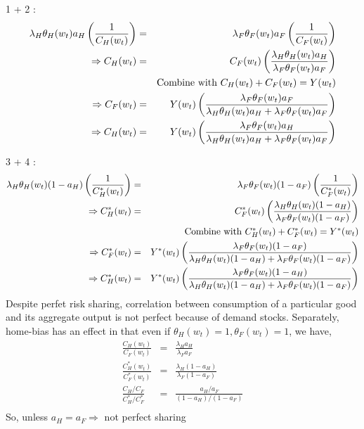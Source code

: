 \documentclass[]{article}
\begin{document}
1 + 2 :
\begin{eqnarray}
\lambda_H \theta_H(w_t) a_H \left(\frac{1}{C_H(w_t)}\right) &=& \lambda_F \theta_F(w_t) a_F \left(\frac{1}{C_F(w_t)}\right)\notag\\
\Rightarrow C_H(w_t) &=& C_F(w_t) \left(\frac{\lambda_H \theta_H(w_t)a_H}{\lambda_F \theta_F(w_t)a_F}\right)\notag\\
&& \mbox{Combine with $C_H(w_t) + C_F(w_t) = Y(w_t)$}\notag\\
\Rightarrow C_F(w_t) &=& Y(w_t) \left(\frac{\lambda_F \theta_F (w_t) a_F}{\lambda_H \theta_H (w_t) a_H + \lambda_F \theta_F (w_t) a_F}\right)\\
\Rightarrow C_H(w_t) &=& Y(w_t) \left(\frac{\lambda_F \theta_F (w_t) a_H}{\lambda_H \theta_H (w_t) a_H + \lambda_F \theta_F (w_t) a_F}\right)
\end{eqnarray}

3 + 4 :
\begin{eqnarray}
\lambda_H \theta_H(w_t) (1-a_H) \left(\frac{1}{C_H^*(w_t)}\right) &=& \lambda_F \theta_F(w_t) (1-a_F) \left(\frac{1}{C_F^*(w_t)}\right)\notag\\
\Rightarrow C_H^*(w_t) &=& C_F^*(w_t) \left(\frac{\lambda_H \theta_H(w_t)(1-a_H)}{\lambda_F \theta_F(w_t)(1-a_F)}\right)\notag\\
&& \mbox{Combine with $C_H^*(w_t) + C_F^*(w_t) = Y^*(w_t)$}\notag\\
\Rightarrow C_F^*(w_t) &=& Y^*(w_t) \left(\frac{\lambda_F \theta_F (w_t) (1-a_F)}{\lambda_H \theta_H (w_t) (1-a_H) + \lambda_F \theta_F (w_t) (1-a_F)}\right)\\
\Rightarrow C_H^*(w_t) &=& Y^*(w_t) \left(\frac{\lambda_F \theta_F (w_t) (1-a_H)}{\lambda_H \theta_H (w_t) (1-a_H) + \lambda_F \theta_F (w_t) (1-a_F)}\right)
\end{eqnarray}
Despite perfet risk sharing, correlation between consumption of a particular good and its aggregate output is not perfect because of demand stocks. Separately, home-bias has an effect in that even if $\theta_H(w_t) = 1, \theta_F(w_t) = 1 $, we have,
\begin{eqnarray*}
\frac{C_H(w_t)}{C_F(w_t)} &=& \frac{\lambda_H a_H}{\lambda_F a_F}\\
\frac{C_H^*(w_t)}{C_F^*(w_t)} &=& \frac{\lambda_H (1-a_H)}{\lambda_F (1-a_F)}\\
\frac{C_H/C_F}{C_H^*/C_F^*} &=& \frac{a_H/a_F}{(1-a_H)/(1-a_F)}\\
\end{eqnarray*}
So, unless $a_H = a_F \Rightarrow$ not perfect sharing\\
\end{document}
